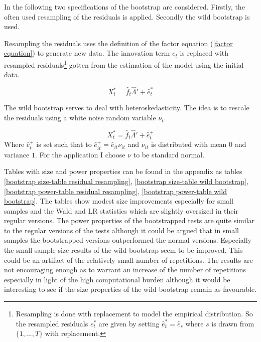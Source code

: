\documentclass[12pt]{article}
\begin{document}
In the following two specifications of the bootstrap are considered. Firstly, the often used resampling of the residuals is applied. Secondly the wild bootstrap is used. 

Resampling the residuals uses the definition of the factor equation (\ref{factor equation}) to generate new data. The innovation term $e_t$ is replaced with resampled residuals\footnote{Resampling is done with replacement to model the empirical distribution. So the resampled residuals $e_t^*$ are given by setting $\hat e_t^* = \hat e_s$ where $s$ is drawn from $\{1, ..., T\}$ with replacement.} gotten from the estimation of the model using the initial data.

\begin{equation}
	\label{factor equation, bootstrapped}
	X_t^* = \hat f_t \hat \Lambda' + \hat e_t^*
\end{equation}

The wild bootstrap serves to deal with heteroskedasticity. The idea is to rescale the residuals using a white noise random variable $\nu_t$.

$$X_t^* = \hat f_t \hat \Lambda' + \hat e_t^+$$
Where $\hat e_t^+$ is set such that to $\hat e_{it}^+ = \hat e_{it} \nu_{it}$ and $\nu_{it}$ is distributed with mean $0$ and variance $1$. For the application I choose $\nu$ to be standard normal.


Tables with size and power properties can be found in the appendix as tables \ref{bootstrap size-table residual resampling}, \ref{bootstrap size-table wild bootstrap}, \ref{bootstrap power-table residual resampling}, \ref{bootstrap power-table wild bootstrap}. The tables show modest size improvements especially for small samples and the Wald and LR statistics which are slightly oversized in their regular versions. The power properties of the bootstrapped tests are quite similar to the regular versions of the tests although it could be argued that in small samples the bootstrapped versions outperformed the normal versions.
Especially the small sample size results of the wild bootstrap seem to be improved. This could be an artifact of the relatively small number of repetitions. The results are not encouraging enough as to warrant an increase of the number of repetitions especially in light of the high computational burden although it would be interesting to see if the size properties of the wild bootstrap remain as favourable.
\end{document}
